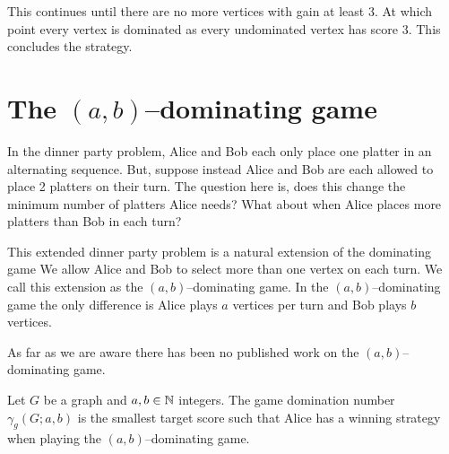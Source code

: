 This continues until there are no more vertices with gain at least 3. At which point every vertex is dominated as every undominated vertex has score 3. This concludes the strategy.

\section{The $(a,b)$--dominating game}

In the dinner party problem, Alice and Bob each only place one platter in an alternating sequence. But, suppose instead Alice and Bob are each allowed to place 2 platters on their turn. The question here is, does this change the minimum number of platters Alice needs? What about when Alice places more platters than Bob in each turn?

This extended dinner party problem is a natural extension of the dominating game We allow Alice and Bob to select more than one vertex on each turn. We call this extension as the $(a,b)$--dominating game. In the $(a,b)$--dominating game the only difference is Alice plays $a$ vertices per turn and Bob plays $b$ vertices.

As far as we are aware there has been no published work on the $(a,b)$--dominating game. 

\begin{definition}
    Let $G$ be a graph and $a,b\in\mathbb{N}$ integers. The game domination number $\gamma_g(G;a,b)$ is the smallest target score such that Alice has a winning strategy when playing the $(a,b)$--dominating game.
\end{definition}

